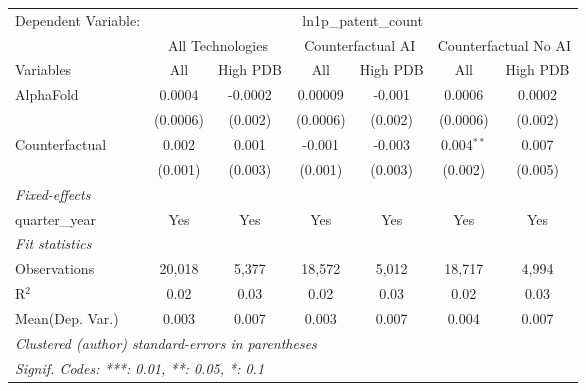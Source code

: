 \begingroup
\centering
\begin{tabular}{lcccccc}
   \tabularnewline \midrule \midrule
   Dependent Variable: & \multicolumn{6}{c}{ln1p\_patent\_count}\\
 & \multicolumn{2}{c}{All Technologies} & \multicolumn{2}{c}{Counterfactual AI} & \multicolumn{2}{c}{Counterfactual No AI} \\
\cmidrule(lr){1-1}\cmidrule(lr){2-3} \cmidrule(lr){4-5} \cmidrule(lr){6-7}
Variables & \multicolumn{1}{c}{All} & \multicolumn{1}{c}{High PDB} & \multicolumn{1}{c}{All} & \multicolumn{1}{c}{High PDB} & \multicolumn{1}{c}{All} & \multicolumn{1}{c}{High PDB} \\
\cmidrule(lr){1-1}\cmidrule(lr){2-2} \cmidrule(lr){3-3} \cmidrule(lr){4-4} \cmidrule(lr){5-5} \cmidrule(lr){6-6} \cmidrule(lr){7-7}
   AlphaFold      & 0.0004   & -0.0002 & 0.00009  & -0.001  & 0.0006       & 0.0002\\   
                  & (0.0006) & (0.002) & (0.0006) & (0.002) & (0.0006)     & (0.002)\\   
   Counterfactual & 0.002    & 0.001   & -0.001   & -0.003  & 0.004$^{**}$ & 0.007\\   
                  & (0.001)  & (0.003) & (0.001)  & (0.003) & (0.002)      & (0.005)\\   
   \midrule
   \emph{Fixed-effects}\\
   quarter\_year  & Yes      & Yes     & Yes      & Yes     & Yes          & Yes\\  
   \midrule
   \emph{Fit statistics}\\
   Observations   & 20,018   & 5,377   & 18,572   & 5,012   & 18,717       & 4,994\\  
   R$^2$          & 0.02     & 0.03    & 0.02     & 0.03    & 0.02         & 0.03\\  
Mean(Dep. Var.) & 0.003 & 0.007 & 0.003 & 0.007 & 0.004 & 0.007 \\
   \midrule \midrule
   \multicolumn{7}{l}{\emph{Clustered (author) standard-errors in parentheses}}\\
   \multicolumn{7}{l}{\emph{Signif. Codes: ***: 0.01, **: 0.05, *: 0.1}}\\
\end{tabular}
\par\endgroup
